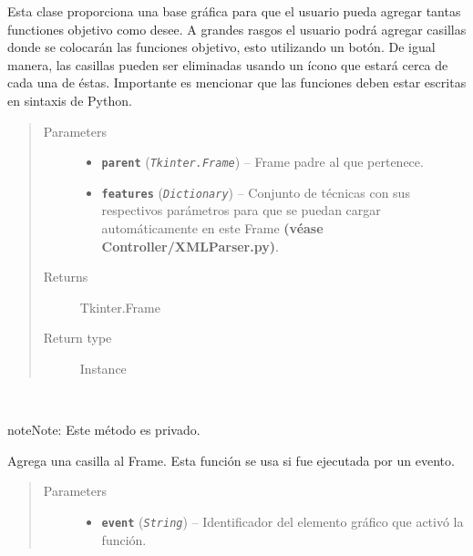 \documentclass[class=report, crop=false]{standalone}
\begin{document}
\begin{fulllineitems}

\begin{DUlineblock}{0em}
\item[] Esta clase proporciona una base gráfica para que 
el usuario pueda agregar tantas functiones objetivo como 
desee.\break
A grandes rasgos el usuario podrá agregar casillas donde 
se colocarán las funciones objetivo, esto utilizando un botón.\break
De igual manera, las casillas pueden ser eliminadas
usando un ícono que estará cerca de cada una de éstas.\break
Importante es mencionar que las funciones deben estar 
escritas en sintaxis de Python.
\end{DUlineblock}

\begin{quote}\begin{description}
\item[{Parameters}] \leavevmode\begin{itemize}
\item \textbf{\texttt{parent}} (\emph{\texttt{Tkinter.Frame}}) -- Frame padre al que pertenece.
\item \textbf{\texttt{features}} (\emph{\texttt{Dictionary}}) -- Conjunto de técnicas con sus respectivos parámetros para que se puedan cargar automáticamente en este Frame \textbf{(véase Controller/XMLParser.py)}.
\end{itemize}

\item[{Returns}] \leavevmode
Tkinter.Frame
\item[{Return type}] \leavevmode
Instance
\end{description}\end{quote}


\begin{fulllineitems}

~

\begin{notice}{note}{Note:}
Este método es privado.
\end{notice}

Agrega una casilla al Frame.\break
Esta función se usa si fue ejecutada 
por un evento.

\begin{quote}\begin{description}
\item[{Parameters}] \leavevmode\begin{itemize}
\item \textbf{\texttt{event}} (\emph{\texttt{String}}) -- Identificador del elemento gráfico que activó la función.
\end{itemize}
\end{description}\end{quote}


\end{fulllineitems}
\end{fulllineitems}
\end{document}
